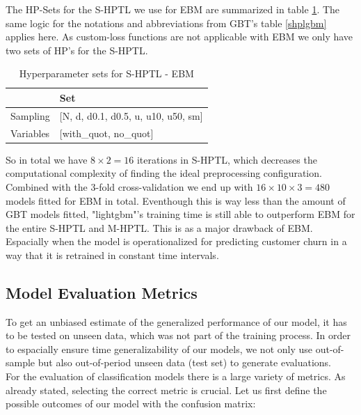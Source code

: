 \documentclass[12pt,titlepage]{article}
\begin{document}
The HP-Sets for the S-HPTL we use for EBM are summarized in table \ref{shpebm}. The same logic for the notations and abbreviations from GBT's table \ref{shplgbm} applies here. As custom-loss functions are not applicable with EBM we only have two sets of HP's for the S-HPTL. \\
\begin{table}[H]
    \centering
    \begin{tabular}{|l|l|}
    \hline
              & Set  \\
    \hline
    Sampling &  [N, d, d0.1, d0.5, u, u10, u50, sm]  \\
    Variables & [with\_quot, no\_quot] \\
    \hline
    \end{tabular}
    \caption{Hyperparameter sets for S-HPTL - EBM}
    \label{shpebm}
\end{table}
\vspace{3mm}
\noindent
So in total we have $8\times2=16$ iterations in S-HPTL, which decreases the computational complexity of finding the ideal preprocessing configuration. Combined with the 3-fold cross-validation we end up with $16\times10\times3=480$ models fitted for EBM in total. Eventhough this is way less than the amount of GBT models fitted, "lightgbm"'s training time is still able to outperform EBM for the entire S-HPTL and M-HPTL. This is as a major drawback of EBM. Espacially when the model is operationalized for predicting customer churn in a way that it is retrained in constant time intervals. \\

\subsection{Model Evaluation Metrics} \par

To get an unbiased estimate of the generalized performance of our model, it has to be tested on unseen data, which was not part of the training process. In order to espacially ensure time generalizability of our models, we not only use out-of-sample but also out-of-period unseen data (test set) to generate evaluations. \\
For the evaluation of classification models there is a large variety of metrics. As already stated, selecting the correct metric is crucial. Let us first define the possible outcomes of our model with the confusion matrix: \\
\end{document}

